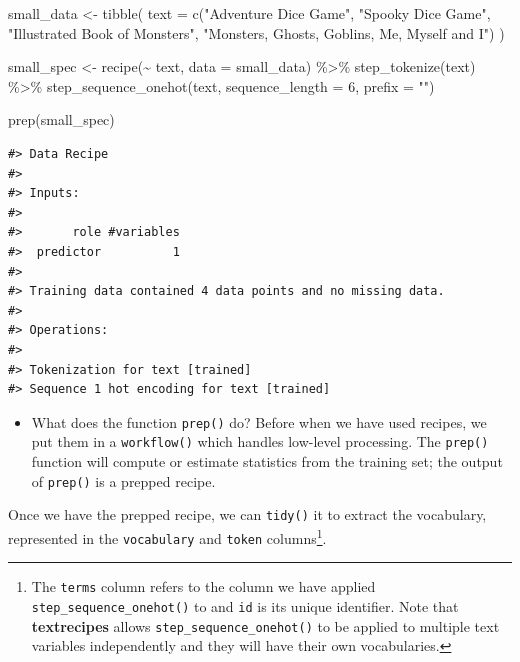 \documentclass[
]{krantz}
\makeatletter
\newenvironment{Shaded}{\begin{snugshade}}{\end{snugshade}}
\newcommand{\AttributeTok}[1]{\textcolor[rgb]{0.77,0.63,0.00}{#1}}
\newcommand{\DecValTok}[1]{\textcolor[rgb]{0.00,0.00,0.81}{#1}}
\newcommand{\FunctionTok}[1]{\textcolor[rgb]{0.00,0.00,0.00}{#1}}
\newcommand{\NormalTok}[1]{#1}
\newcommand{\OtherTok}[1]{\textcolor[rgb]{0.56,0.35,0.01}{#1}}
\newcommand{\SpecialCharTok}[1]{\textcolor[rgb]{0.00,0.00,0.00}{#1}}
\newcommand{\StringTok}[1]{\textcolor[rgb]{0.31,0.60,0.02}{#1}}
\newenvironment{kframe}{%
\medskip{}
\setlength{\fboxsep}{.8em}
 \def\at@end@of@kframe{}%
 \ifinner\ifhmode%
  \def\at@end@of@kframe{\end{minipage}}%
  \begin{minipage}{\columnwidth}%
 \fi\fi%
 \def\FrameCommand##1{\hskip\@totalleftmargin \hskip-\fboxsep
 \colorbox{shadecolor}{##1}\hskip-\fboxsep
     \hskip-\linewidth \hskip-\@totalleftmargin \hskip\columnwidth}%
 \MakeFramed {\advance\hsize-\width
   \@totalleftmargin\z@ \linewidth\hsize
   \@setminipage}}%
 {\par\unskip\endMakeFramed%
 \at@end@of@kframe}
\renewenvironment{Shaded}{\begin{kframe}}{\end{kframe}}
\newenvironment{rmdblock}[1]
  {\begin{shaded*}
  \begin{itemize}[left = -1cm, labelsep = 1cm]
  \renewcommand{\labelitemi}{
    \raisebox{-.7\height}[0pt][0pt]{
      {\setkeys{Gin}{width=3em,keepaspectratio}\texttt{[image: images/\#1]}}
    }
  }
 
  \item
  }
  {
  \end{itemize}
  \end{shaded*}
  }
\newenvironment{rmdwarning}
  {\begin{rmdblock}{warning}}
  {\end{rmdblock}}
\makeatother
\begin{document}
\begin{Shaded}
\begin{Highlighting}[]
\NormalTok{small\_data }\OtherTok{\textless{}{-}} \FunctionTok{tibble}\NormalTok{(}
  \AttributeTok{text =} \FunctionTok{c}\NormalTok{(}\StringTok{"Adventure Dice Game"}\NormalTok{,}
           \StringTok{"Spooky Dice Game"}\NormalTok{,}
           \StringTok{"Illustrated Book of Monsters"}\NormalTok{,}
           \StringTok{"Monsters, Ghosts, Goblins, Me, Myself and I"}\NormalTok{)}
\NormalTok{)}

\NormalTok{small\_spec }\OtherTok{\textless{}{-}} \FunctionTok{recipe}\NormalTok{(}\SpecialCharTok{\textasciitilde{}}\NormalTok{ text, }\AttributeTok{data =}\NormalTok{ small\_data) }\SpecialCharTok{\%\textgreater{}\%}
  \FunctionTok{step\_tokenize}\NormalTok{(text) }\SpecialCharTok{\%\textgreater{}\%}
  \FunctionTok{step\_sequence\_onehot}\NormalTok{(text, }\AttributeTok{sequence\_length =} \DecValTok{6}\NormalTok{, }\AttributeTok{prefix =} \StringTok{""}\NormalTok{)}

\FunctionTok{prep}\NormalTok{(small\_spec)}
\end{Highlighting}
\end{Shaded}

\begin{verbatim}
#> Data Recipe
#> 
#> Inputs:
#> 
#>       role #variables
#>  predictor          1
#> 
#> Training data contained 4 data points and no missing data.
#> 
#> Operations:
#> 
#> Tokenization for text [trained]
#> Sequence 1 hot encoding for text [trained]
\end{verbatim}

\begin{rmdwarning}
What does the function \texttt{prep()} do? Before when we have used
recipes, we put them in a \texttt{workflow()} which handles low-level
processing. The \texttt{prep()} function will compute or estimate
statistics from the training set; the output of \texttt{prep()} is a
prepped recipe.
\end{rmdwarning}

Once we have the prepped recipe, we can \texttt{tidy()} it to extract the vocabulary, represented in the \texttt{vocabulary} and \texttt{token} columns\footnote{The \texttt{terms} column refers to the column we have applied \texttt{step\_sequence\_onehot()} to and \texttt{id} is its unique identifier. Note that \textbf{textrecipes} allows \texttt{step\_sequence\_onehot()} to be applied to multiple text variables independently and they will have their own vocabularies.}.
\end{document}
